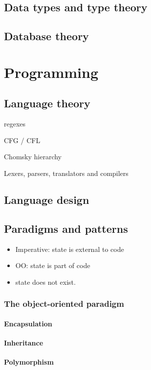 \documentclass{report}
\begin{document}
\chapter{Data types and type theory}


\chapter{Database theory}

\part{Programming}
\setcounter{chapter}{0} %

\chapter{Language theory}

regexes

CFG / CFL

Chomsky hierarchy

Lexers, parsers, translators and compilers
\chapter{Language design}


\chapter{Paradigms and patterns}
\begin{itemize}
\item Imperative: state is external to code
\item OO: state is part of code
\item state does not exist.
\end{itemize}
\section{The object-oriented paradigm}
\subsection{Encapsulation}
\subsection{Inheritance}
\subsection{Polymorphism}
\end{document}
